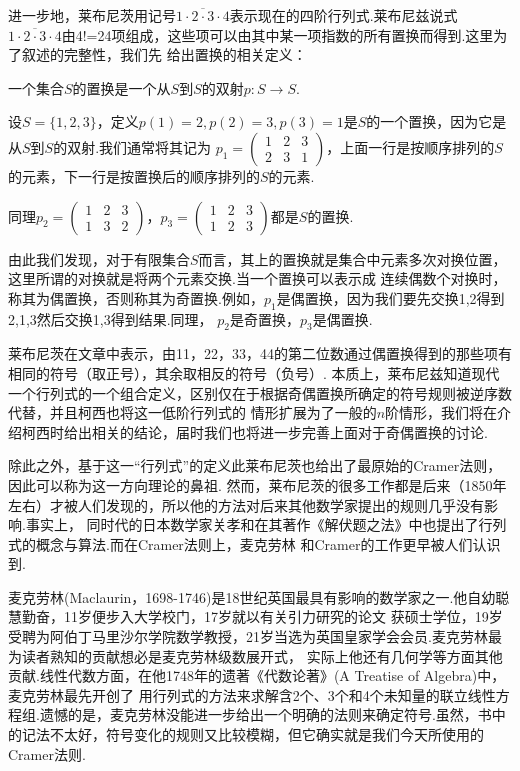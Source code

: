 进一步地，莱布尼茨用记号$\overline{1\cdot 2\cdot 3\cdot 4}$表示现在的四阶行列式.莱布尼兹说式
$\overline{1\cdot 2\cdot 3\cdot 4}$由4!=24项组成，这些项可以由其中某一项指数的所有置换而得到.这里为了叙述的完整性，我们先
给出置换的相关定义：
\begin{definition}
    一个集合$S$的置换是一个从$S$到$S$的双射$p:S\to S$.
\end{definition}
\begin{example}
    设$S=\{1,2,3\}$，定义$p(1)=2,p(2)=3,p(3)=1$是$S$的一个置换，因为它是从$S$到$S$的双射.我们通常将其记为
    $p_1=\begin{pmatrix}
        1&2&3\\
        2&3&1
    \end{pmatrix}$，上面一行是按顺序排列的$S$的元素，下一行是按置换后的顺序排列的$S$的元素.

    同理$p_2=\begin{pmatrix}
        1&2&3\\
        1&3&2
    \end{pmatrix}$，$p_3=\begin{pmatrix}
        1&2&3\\
        1&2&3
    \end{pmatrix}$都是$S$的置换.
\end{example}

由此我们发现，对于有限集合$S$而言，其上的置换就是集合中元素多次对换位置，这里所谓的对换就是将两个元素交换.当一个置换可以表示成
连续偶数个对换时，称其为偶置换，否则称其为奇置换.例如，$p_1$是偶置换，因为我们要先交换1,2得到2,1,3然后交换1,3得到结果.同理，
$p_2$是奇置换，$p_3$是偶置换.

莱布尼茨在文章中表示，由11，22，33，44的第二位数通过偶置换得到的那些项有相同的符号（取正号），其余取相反的符号（负号）.
本质上，莱布尼兹知道现代一个行列式的一个组合定义，区别仅在于根据奇偶置换所确定的符号规则被逆序数代替，并且柯西也将这一低阶行列式的
情形扩展为了一般的$n$阶情形，我们将在介绍柯西时给出相关的结论，届时我们也将进一步完善上面对于奇偶置换的讨论.

除此之外，基于这一``行列式''的定义此莱布尼茨也给出了最原始的Cramer法则，因此可以称为这一方向理论的鼻祖.
然而，莱布尼茨的很多工作都是后来（1850年左右）才被人们发现的，所以他的方法对后来其他数学家提出的规则几乎没有影响.事实上，
同时代的日本数学家关孝和在其著作《解伏题之法》中也提出了行列式的概念与算法.而在Cramer法则上，麦克劳林
和Cramer的工作更早被人们认识到.

麦克劳林(Maclaurin，1698-1746)是18世纪英国最具有影响的数学家之一.他自幼聪慧勤奋，11岁便步入大学校门，17岁就以有关引力研究的论文
获硕士学位，19岁受聘为阿伯丁马里沙尔学院数学教授，21岁当选为英国皇家学会会员.麦克劳林最为读者熟知的贡献想必是麦克劳林级数展开式，
实际上他还有几何学等方面其他贡献.线性代数方面，在他1748年的遗著《代数论著》(A Treatise of Algebra)中，麦克劳林最先开创了
用行列式的方法来求解含2个、3个和4个未知量的联立线性方程组.遗憾的是，麦克劳林没能进一步给出一个明确的法则来确定符号.虽然，书中
的记法不太好，符号变化的规则又比较模糊，但它确实就是我们今天所使用的Cramer法则.


